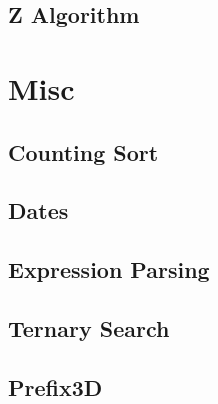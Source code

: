 \subsection{Z Algorithm}
\raggedbottom
\hrulefill

\section{Misc}
\subsection{Counting Sort}
\raggedbottom
\hrulefill
\subsection{Dates}
\raggedbottom
\hrulefill
\subsection{Expression Parsing}
\raggedbottom
\hrulefill
\subsection{Ternary Search}
\raggedbottom
\hrulefill
\subsection{Prefix3D}
\raggedbottom
\hrulefill

